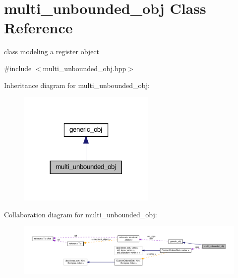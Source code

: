 \hypertarget{classmulti__unbounded__obj}{}\section{multi\+\_\+unbounded\+\_\+obj Class Reference}
\label{classmulti__unbounded__obj}


class modeling a register object  




{\ttfamily \#include $<$multi\+\_\+unbounded\+\_\+obj.\+hpp$>$}



Inheritance diagram for multi\+\_\+unbounded\+\_\+obj\+:
\nopagebreak
\begin{figure}[H]
\begin{center}
\leavevmode
\includegraphics[width=188pt]{d1/dd1/classmulti__unbounded__obj__inherit__graph}
\end{center}
\end{figure}


Collaboration diagram for multi\+\_\+unbounded\+\_\+obj\+:
\nopagebreak
\begin{figure}[H]
\begin{center}
\leavevmode
\includegraphics[width=350pt]{d8/d90/classmulti__unbounded__obj__coll__graph}
\end{center}
\end{figure}
